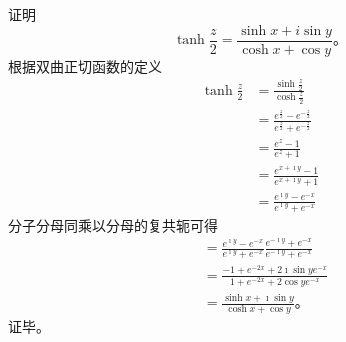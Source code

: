 \begin{examplebox}{证明
    \begin{equation*}\tanh \frac{z}{2}=\frac{\sinh x+i \sin y}{\cosh x+\cos y} \textrm{。}  
    \end{equation*}
}
根据双曲正切函数的定义
\begin{align*}
    \tanh \frac{z}{2} &= \frac{\sinh \frac{z}{2} }{ \cosh \frac{z}{2}}
    \\
    &= \frac{e^{\frac{z}{2}} - e^{-\frac{z}{2}}}{e^{\frac{z}{2}} + e^{-\frac{z}{2}}}
    \\
    &= \frac{e^{z} - 1}{e^{z} + 1} 
    \\
    &= \frac{e^{x+\imath y } -1 } { e^{x + \imath y } + 1}
    \\
    &=\frac{e^{\imath y } -e^{-x} } { e^{\imath y } + e^{-x}}
\end{align*}   
分子分母同乘以分母的复共轭可得
\begin{align*}
    &=\frac{e^{\imath y } -e^{-x} } { e^{\imath y } + e^{-x}} \frac{e^{-\imath y } + e^{-x}} { e^{-\imath y } + e^{-x}}
    \\
    &=\frac{-1+e^{-2x} + 2 \imath \sin y e^{-x}}{1+ e^{-2x} + 2 \cos y e^{-x} }
    \\
    &= \frac{\sinh x + \imath \sin y} {\cosh x + \cos y} \textrm{。}  
\end{align*}
证毕。
\end{examplebox}



%     

